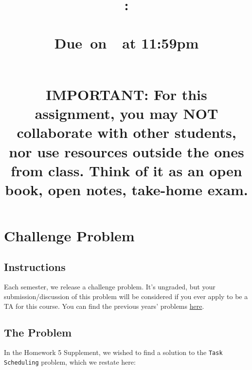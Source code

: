 \documentclass{article}
\title{
    \vspace{2in}
    \textbf{\hmwkClass:\\ \hmwkTitle} \\
    \normalsize\vspace{0.1in}\small{Due\ on\ \hmwkDueDate\ at 11:59pm} \\
    \vspace{0.1in}\large{\textit{\hmwkClassInstructor\ \hmwkSection}} \\
    \vspace{1in}
    \begin{minipage}[t]{0.5\columnwidth}
    {\footnotesize \textbf{IMPORTANT:} For this assignment, you may NOT collaborate with other students, nor use resources outside the ones from class. Think of it as an open book, open notes, take-home exam.}
    \end{minipage}
    \vspace{1in}
    \author{\textbf{\hmwkAuthorName}}
    \date{}
}
\begin{document}
\maketitle
\pagebreak


\section*{Challenge Problem}
    \subsection*{Instructions}
    Each semester, we release a challenge problem. It's ungraded, but your submission/discussion of this problem will be considered if you ever apply to be a TA for this course. You can find the previous years' problems \href{https://github.com/sar-mo/CS2051-HonorsDiscreteMath/blob/main/sp22/extra-credit/Exam 2 Extra Credit.pdf}{here}. 

    \subsection*{The Problem}
    In the Homework 5 Supplement, we wished to find a solution to the \texttt{Task} \texttt{Scheduling} problem, which we restate here:
\end{document}
